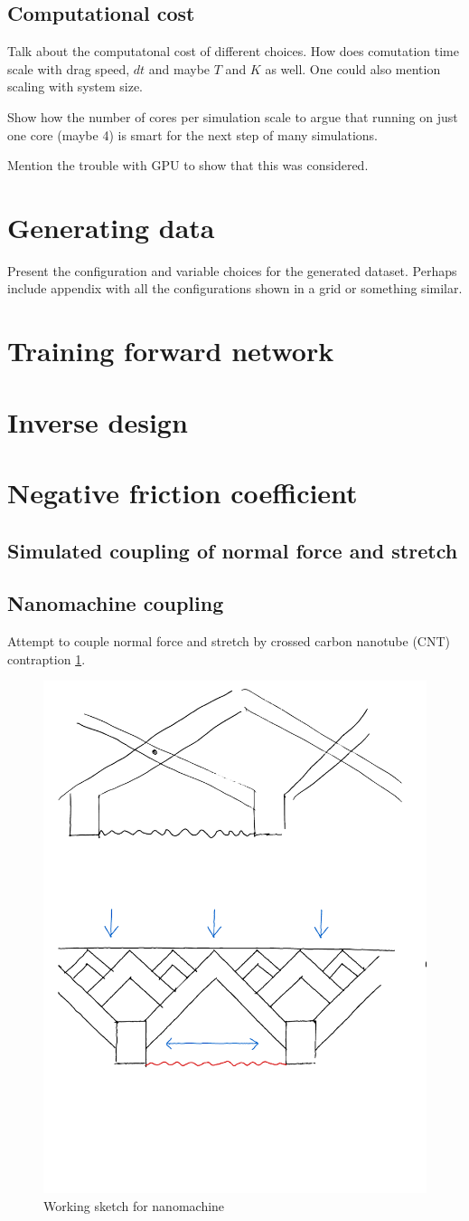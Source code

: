 \subsection{Computational cost}

Talk about the computatonal cost of different choices. How does comutation time scale with drag speed, $dt$ and maybe $T$ and $K$ as well. One could also mention scaling with system size.

Show how the number of cores per simulation scale to argue that running on just one core (maybe 4) is smart for the next step of many simulations. 

Mention the trouble with GPU to show that this was considered. 



\section{Generating data}

Present the configuration and variable choices for the generated dataset. Perhaps include appendix with all the configurations shown in a grid or something similar.


\section{Training forward network}

\section{Inverse design}

\section{Negative friction coefficient}
\subsection{Simulated coupling of normal force and stretch}
\subsection{Nanomachine coupling}
Attempt to couple normal force and stretch by crossed carbon nanotube (CNT) contraption \ref{fig:nanomachine}. 


\begin{figure}[H]
  \centering
  \includegraphics[width=0.5\linewidth]{figures/negative_coefficient/nanomachine.pdf}
  \caption{Working sketch for nanomachine}
  \label{fig:nanomachine}
\end{figure}



